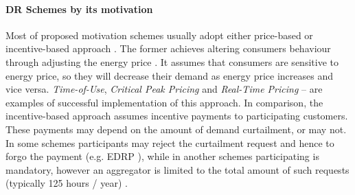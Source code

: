 \paragraph{DR Schemes by its motivation}
Most of proposed motivation schemes usually adopt either price-based or incentive-based approach \cite{Vardakas2015}. The former achieves altering consumers behaviour through adjusting the energy price \cite{Aghaei2013}. It assumes that consumers are sensitive to energy price, so they will decrease their demand as energy price increases and vice versa. \textit{Time-of-Use}\cite{Aghaei2013},  \textit{Critical Peak Pricing}\cite{Zhou2012} and \textit{Real-Time Pricing} \cite{Chen2011} -- are examples of successful implementation of this approach. In comparison, the incentive-based approach assumes incentive payments to participating customers. These payments may depend on the amount of demand curtailment, or may not. In some schemes participants may reject the curtailment request and hence to forgo the payment (e.g. EDRP \cite{Aalami2010}), while in another schemes participating is mandatory, however an aggregator is limited to the total amount of such requests (typically 125 hours / year) \cite{Chen2013}. 




